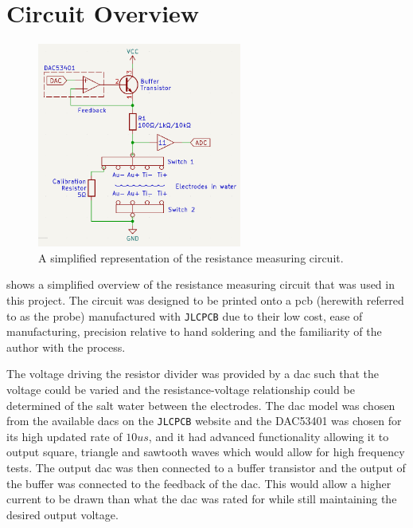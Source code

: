 \section{Circuit Overview}

\begin{figure}
    \centering
    \includegraphics[width=0.6\textwidth]{Figures/CircuitOverview}
    \caption{A simplified representation of the resistance measuring circuit.}
    \label{fig:circuit-overview} %
\end{figure}

 shows a simplified overview of the resistance measuring circuit that was used in this project. 
The circuit was designed to be printed onto a \gls{pcb} (herewith referred to as the probe) manufactured with \texttt{JLCPCB} due to their low cost, ease of manufacturing, precision relative to hand soldering and the familiarity of the author with the process.

The voltage driving the resistor divider was provided by a \gls{dac} such that the voltage could be varied and the resistance-voltage relationship could be determined of the salt water between the electrodes.
The \gls{dac} model was chosen from the available \glspl{dac} on the \texttt{JLCPCB} website and the DAC53401 was chosen for its high updated rate of $10us$, and it had advanced functionality allowing it to output square, triangle and sawtooth waves which would allow for high frequency tests.
The output \gls{dac} was then connected to a buffer transistor and the output of the buffer was connected to the feedback of the \gls{dac}.
This would allow a higher current to be drawn than what the \gls{dac} was rated for while still maintaining the desired output voltage.

